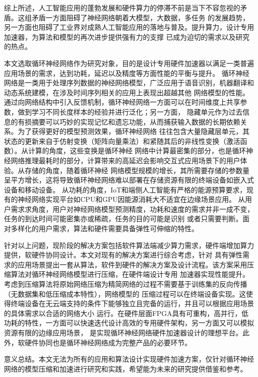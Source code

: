 综上所述，人工智能应用的蓬勃发展和硬件算力的停滞不前是当下不容忽视的矛盾。这组矛盾一方面阻碍了神经网络朝着大模型，大数据，多任务
的发展趋势，另一方面也阻碍了工业界对成熟人工智能应用的落地与普及。提升算力，设计专用加速器，为算法和模型的再次进步提供强有力的支撑
已成为迫切的需求以及研究的热点。

本文选取循环神经网络作为研究对象，目的是设计专用硬件加速器以满足一类普遍应用场景的需求，达到功耗，延迟以及精度等方面性能的平衡与提升。
循环神经网络是一类用于处理序列数据的神经网络模型，广泛应用于语音识别，机器翻译和动态系统建模，在涉及时间序列相关的应用上表现出超越其他
网络模型的性能。通过向网络结构中引入反馈机制，循环神经网络一方面可以在时间维度上共享参数，做到学习不同长度样本的经验并进行泛化；另一方面，
隐藏单元作为过去信息的有损摘要可以巧妙的实现记忆和遗忘功能，从而捕获输入数据的长期依赖关系。为了获得更好的模型预测效果，循环神经网络
往往包含大量隐藏层单元，其状态的更新来自于仿射变换（矩阵向量乘法）和紧随其后的非线性变换（激活函数）。从计算的角度，这些变换是循环神经
网络中计算最密集的部分，也是循环神经网络推理最耗时的部分，计算带来的高延迟会影响交互式应用场景下的用户体验。从存储的角度，随着循环神经
网络模型规模的增长，其所需要存储的参数量呈平方增长，这将导致循环神经网络难以部署在存储资源有限的终端设备如嵌入式设备和移动设备。
从功耗的角度，IoT和端侧人工智能有严格的能源预算要求，现有的神经网络实现平台如CPU和GPU因能源消耗大不适宜在边缘场景应用。
从用户需求求角度，用户对神经网络模型预测精度，功耗和速度的需求并非一成不变，任务的到达时间可能密集亦或稀疏，任务的目的可能是识别
或者只需要判断。面对多样化的用户需求，算法和硬件需要具备弹性可伸缩的特性。

针对以上问题，现阶段的解决方案包括软件算法端减少算力需求，硬件端增加算力提供，软硬件协同设计。本文对现有的解决方案进行综合考虑，针对
具有弹性需求的应用场景提出一套从算法，软件到硬件的解决方案及设计流程。该方案采用压缩算法对循环神经网络模型进行压缩，在硬件端设计专用
加速器实现性能提升。考虑到压缩算法将原始网络压缩为精简网络的过程不需要基于训练集的反向传播（无数据集和低压缩成本特性），网络模型的
压缩过程可以在终端设备实现。这使得终端设备在无云端支持的条件下能够独立且完备的运行，并且可以根据应用场景的具体需求以合适的网络大小
运行。在硬件层面FPGA具有可重构，高并行，低功耗的特性，一方面可以快速迭代设计高效的专用硬件架构，另一方面又可以模拟资源有限的边缘应用场景，
是实现循环神经网络硬件加速器设计的理想平台。此外，软硬件协同也是循环神经网络成为完整产品的必要环节。

意义总结。本文无法为所有的应用和算法设计实现硬件加速方案，仅针对循环神经网络的模型压缩和加速进行研究和实践，希望能为未来的研究提供借鉴和参考。


